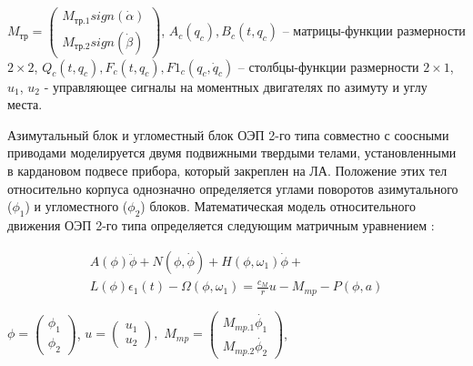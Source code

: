 $M_{\textit{тр}}=\left(\begin{array}{
		cc}
	M_{\textit{тр.1}}sign\left(\dot{\alpha{}}\right) \\
	M_{\textit{тр.2}}sign\left(\dot{\beta{}}\right)
\end{array}\right)$, 
$A_c\left(q_c\right),B_c\left(t,q_c\right)$ – матрицы-функции размерности $2 \times 2$,
$Q_c\left(t,q_c\right),F_c\left(t,q_c\right),F1_c\left(q_c,{\dot{q}}_c\right)$ – столбцы-функции размерности $2 \times 1$,
$u_1$, $u_2$ - управляющее сигналы на моментных двигателях по азимуту и углу места. 

Азимутальный блок и угломестный блок ОЭП 2-го типа совместно с соосными приводами моделируется двумя подвижными твердыми телами, установленными в кардановом подвесе прибора, который закреплен на ЛА. Положение этих тел относительно корпуса однозначно определяется углами поворотов азимутального ($\phi_1$) и угломестного ($\phi_2$) блоков. Математическая модель относительного движения ОЭП 2-го типа определяется следующим матричным уравнением \cite[]{Baloev16}:

\begin{equation}
\label{eq:p2:7-}
\begin{alignedat}{2}
A\left(\phi{}\right)\ddot{\phi{}}+N\left(\phi{},\dot{\phi{}}\right)+H\left(\phi{},{\omega{}}_1\right)\dot{\phi{}}+\\
L\left(\phi{}\right){\epsilon{}}_1(t)-\Omega{}\left(\phi{},{\omega{}}_1\right)=\frac{c_M}{r}u-M_{mp}-P\left(\phi{},a\right)
\end{alignedat}
\end{equation}

$\phi{}=\left(\begin{array}{
	cc}
{\phi{}}_1 \\
{\phi{}}_2
\end{array}\right)$, $u=\left(\begin{array}{
	cc}
u_1 \\
u_2
\end{array}\right),$ $M_{mp}=\left(\begin{array}{
	cc}
M_{\textit{mp.1}} \dot{\phi_1} \\
M_{\textit{mp.2}} \dot{\phi_2}
\end{array}\right)$,

